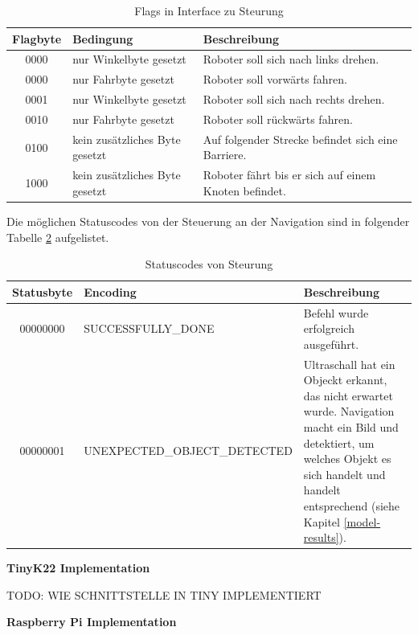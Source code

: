 \begin{table}[H]
\centering
\small
\begin{tabularx}{\textwidth}{|c|X|X|}
\hline
  \textbf{Flagbyte} & \textbf{Bedingung} & \textbf{Beschreibung}\\
  \hline
      0000&nur Winkelbyte gesetzt&Roboter soll sich nach links drehen.\\
  \hline
        0000&nur Fahrbyte gesetzt&Roboter soll vorwärts fahren.\\
  \hline
0001&nur Winkelbyte gesetzt&Roboter soll sich nach rechts drehen.\\
  \hline

0010&nur Fahrbyte gesetzt&Roboter soll rückwärts fahren.\\
  \hline

0100&kein zusätzliches Byte gesetzt&Auf folgender Strecke befindet sich eine Barriere.\\
  \hline
1000&kein zusätzliches Byte gesetzt&Roboter fährt bis er sich auf einem Knoten befindet.\\
  \hline
  \end{tabularx}
\caption{Flags in Interface zu Steurung}
\label{table:flag-to-tiny}
\end{table}



Die möglichen Statuscodes von der Steuerung an der Navigation sind in folgender Tabelle \ref{table:statuscodes} aufgelistet.

\begin{table}[H]
\centering
\small
\begin{tabularx}{\textwidth}{|c|l|X|}
\hline
  \textbf{Statusbyte} & \textbf{Encoding} & \textbf{Beschreibung} \\
  \hline
      00000000&SUCCESSFULLY\_DONE&Befehl wurde erfolgreich ausgeführt. \\
  \hline
00000001&UNEXPECTED\_OBJECT\_DETECTED &Ultraschall hat ein Objeckt erkannt, das nicht erwartet wurde. Navigation macht ein Bild und detektiert, um welches Objekt es sich handelt und handelt entsprechend (siehe Kapitel \ref{model-results}).\\
  \hline
\end{tabularx}
\caption{Statuscodes von Steurung}
\label{table:statuscodes}
\end{table}

\textbf{TinyK22 Implementation}

TODO: WIE SCHNITTSTELLE IN TINY IMPLEMENTIERT

\textbf{Raspberry Pi Implementation}

